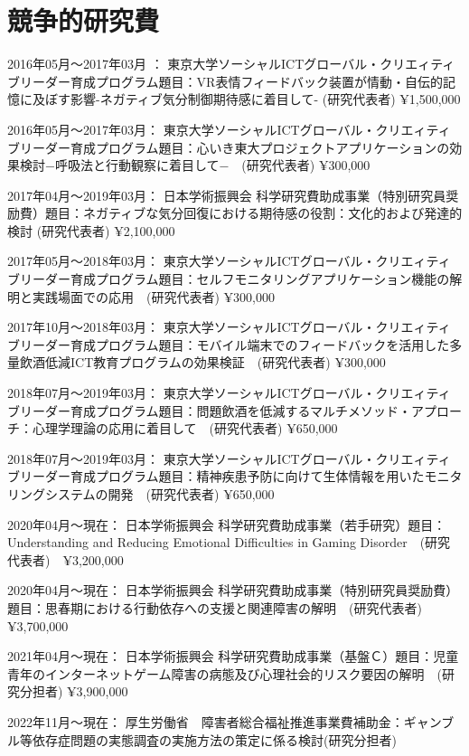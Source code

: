 \documentclass[11pt,a4paper]{article}
\begin{document}
\section{競争的研究費}
\begin{description}
	\item 2016年05月〜2017年03月	： 東京大学ソーシャルICTグローバル・クリエィティブリーダー育成プログラム題目：VR表情フィードバック装置が情動・自伝的記憶に及ぼす影響-ネガティブ気分制御期待感に着目して- (研究代表者) ¥1,500,000
	\item 2016年05月〜2017年03月： 東京大学ソーシャルICTグローバル・クリエィティブリーダー育成プログラム題目：心いき東大プロジェクトアプリケーションの効果検討−呼吸法と行動観察に着目して−　(研究代表者) ¥300,000
	\item 2017年04月〜2019年03月： 日本学術振興会 科学研究費助成事業（特別研究員奨励費）題目：ネガティブな気分回復における期待感の役割：文化的および発達的検討 (研究代表者) ¥2,100,000
	\item 2017年05月〜2018年03月： 東京大学ソーシャルICTグローバル・クリエィティブリーダー育成プログラム題目：セルフモニタリングアプリケーション機能の解明と実践場面での応用　(研究代表者) ¥300,000
	\item 2017年10月〜2018年03月： 東京大学ソーシャルICTグローバル・クリエィティブリーダー育成プログラム題目：モバイル端末でのフィードバックを活用した多量飲酒低減ICT教育プログラムの効果検証　(研究代表者) ¥300,000
	\item 2018年07月〜2019年03月： 東京大学ソーシャルICTグローバル・クリエィティブリーダー育成プログラム題目：問題飲酒を低減するマルチメソッド・アプローチ：心理学理論の応用に着目して　(研究代表者) ¥650,000
	\item 2018年07月〜2019年03月： 東京大学ソーシャルICTグローバル・クリエィティブリーダー育成プログラム題目：精神疾患予防に向けて生体情報を用いたモニタリングシステムの開発　(研究代表者) ¥650,000
	\item 2020年04月〜現在： 日本学術振興会 科学研究費助成事業（若手研究）題目：Understanding and Reducing Emotional Difficulties in Gaming Disorder　(研究代表者)　¥3,200,000
	\item 2020年04月〜現在： 日本学術振興会 科学研究費助成事業（特別研究員奨励費）題目：思春期における行動依存への支援と関連障害の解明　(研究代表者) ¥3,700,000
	\item 2021年04月〜現在： 日本学術振興会 科学研究費助成事業（基盤Ｃ）題目：児童青年のインターネットゲーム障害の病態及び心理社会的リスク要因の解明　(研究分担者) ¥3,900,000
	\item 2022年11月〜現在： 厚生労働省　障害者総合福祉推進事業費補助金：ギャンブル等依存症問題の実態調査の実施方法の策定に係る検討(研究分担者)
\end{description}
\end{document}
